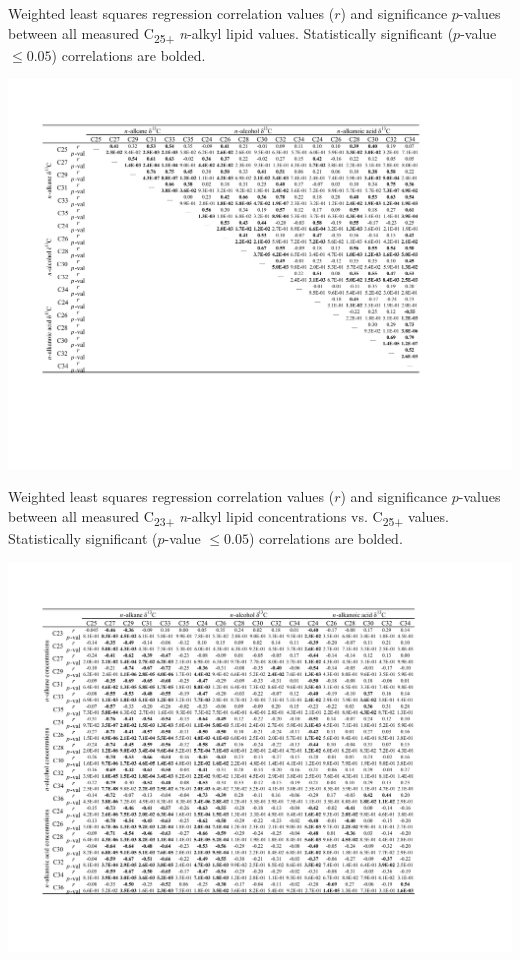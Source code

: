 \begin{table}
	\caption[C\textsubscript{25+}  correlation $r$ and $p$-values]{Weighted least squares regression correlation values ($r$) and significance $p$-values between all measured C\textsubscript{25+} \textit{n}-alkyl lipid  values. Statistically significant ($p$-value $\leq  0.05$) correlations are bolded.}
	\centering
		\includegraphics{Thesis_Tables/Ch4Tab2}
	\label{Ch4Tab:2} 
\end{table}

\begin{table}
	\caption[C\textsubscript{25+} concentration vs.  correlation $r$ and $p$-values]{Weighted least squares regression correlation values ($r$) and significance $p$-values between all measured C\textsubscript{23+} \textit{n}-alkyl lipid concentrations vs. C\textsubscript{25+}  values. Statistically significant ($p$-value $\leq  0.05$) correlations are bolded.}
	\centering
		\includegraphics{Thesis_Tables/Ch4Tab3}
	\label{Ch4Tab:3} 
\end{table}

